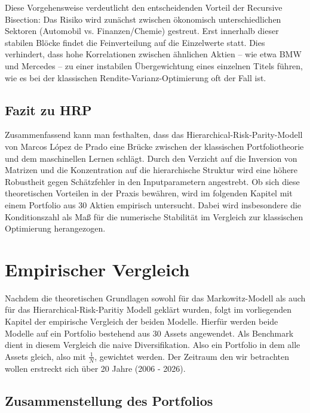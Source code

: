 \documentclass[parskip=half]{scrartcl}
\begin{document}
	Diese Vorgehensweise verdeutlicht den entscheidenden Vorteil der {Recursive Bisection}: Das Risiko wird zunächst zwischen ökonomisch unterschiedlichen Sektoren (Automobil vs. Finanzen/Chemie) gestreut. Erst innerhalb dieser stabilen Blöcke findet die Feinverteilung auf die Einzelwerte statt. Dies verhindert, dass hohe Korrelationen zwischen ähnlichen Aktien – wie etwa BMW und Mercedes – zu einer instabilen Übergewichtung eines einzelnen Titels führen, wie es bei der klassischen Rendite-Varianz-Optimierung oft der Fall ist.
	
	
	\subsection{Fazit zu HRP}
	
	Zusammenfassend kann man festhalten, dass das Hierarchical-Risk-Parity-Modell von Marcos López de Prado eine Brücke zwischen der klassischen Portfoliotheorie und dem maschinellen Lernen schlägt. Durch den Verzicht auf die Inversion von Matrizen und die Konzentration auf die hierarchische Struktur wird eine höhere Robustheit gegen Schätzfehler in den Inputparametern angestrebt. Ob sich diese theoretischen Vorteilen in der Praxis bewähren, wird im folgenden Kapitel mit einem Portfolio aus 30 Aktien empirisch untersucht. Dabei wird insbesondere die Konditionszahl als Maß für die numerische Stabilität im Vergleich zur klassischen Optimierung herangezogen.
	
	\clearpage
	
	\section{Empirischer Vergleich}
	
	Nachdem die theoretischen Grundlagen sowohl für das Markowitz-Modell als auch für das Hierarchical-Risk-Paritiy Modell geklärt wurden, folgt im vorliegenden Kapitel der empirische Vergleich der beiden Modelle. Hierfür werden beide Modelle auf ein Portfolio bestehend aus 30 Assets angewendet. Als Benchmark dient in diesem Vergleich die naive Diversifikation. Also ein Portfolio in dem alle Assets gleich, also mit $\frac{1}{N}$, gewichtet werden. Der Zeitraum den wir betrachten wollen erstreckt sich über 20 Jahre (2006 - 2026).
	
	\subsection{Zusammenstellung des Portfolios}
	
\end{document}
